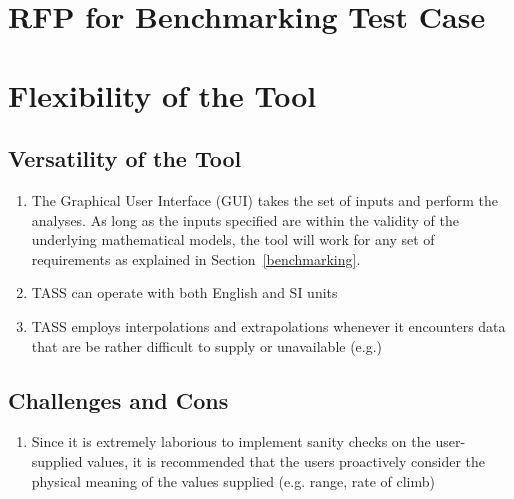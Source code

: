 \documentclass[pdftex,11pt,letter]{article}
\begin{document}

	

\appendix
\section{RFP for Benchmarking Test Case}\label{rfpbench}

\section{Flexibility of the Tool}
\label{appendix:flexibility}

\subsection{Versatility of the Tool}

\begin{enumerate}

\item The Graphical User Interface (GUI) takes the set of inputs and perform the analyses. As long as the inputs specified are within the validity of the underlying mathematical models, the tool will work for any set of requirements as explained in Section~\ref{benchmarking}.

\item TASS can operate with both English and SI units

\item TASS employs interpolations and extrapolations whenever it encounters data that are be rather difficult to supply or unavailable (e.g.) 

\end{enumerate}

\subsection{Challenges and Cons}

\begin{enumerate}

\item  Since it is extremely laborious to implement sanity checks on the user-supplied values, it is recommended that the users proactively consider the physical meaning of the values supplied (e.g. range, rate of climb)

\end{enumerate}
\end{document}
